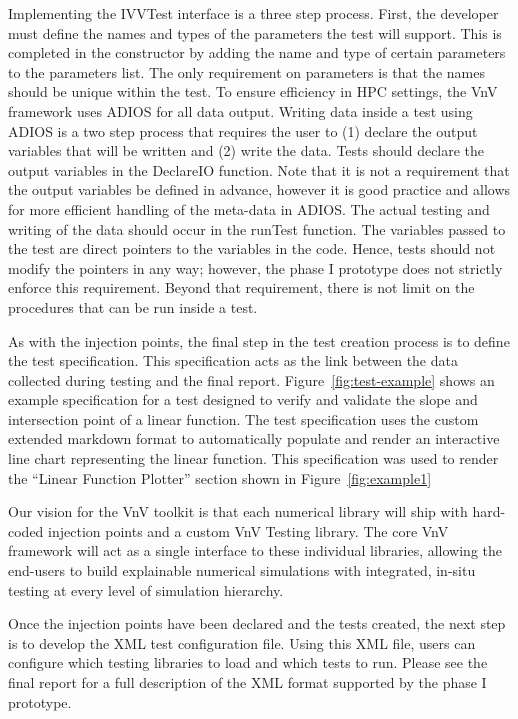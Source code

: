 Implementing the IVVTest interface is a three step process. First, the developer must define the names and types of the parameters the test will support. This is completed in the constructor by adding the name and type of certain parameters to the parameters list. The only requirement on parameters is that the names should be unique within the test. To ensure efficiency in HPC settings, the VnV framework uses ADIOS for all data output. Writing data inside a test using ADIOS is a two step process that requires the user to (1) declare the output variables that will be written and (2) write the data. Tests should declare the output variables in the DeclareIO function. Note that it is not a requirement that the output variables be defined in advance, however it is good practice and allows for more efficient handling of the meta-data in ADIOS. The actual testing and writing of the data should occur in the runTest function. The variables passed to the test are direct pointers to the variables in the code. Hence, tests should not modify the pointers in any way; however, the phase I prototype does not strictly enforce this requirement. Beyond that requirement, there is not limit on the procedures that can be run inside a test. 

As with the injection points, the final step in the test creation process is to define the test specification. This specification acts as the link between the data collected during testing and the final report. Figure~\ref{fig:test-example} shows an example specification for a test designed to verify and validate the slope and intersection point of a linear function. The test specification uses the custom extended markdown format to automatically populate and render an interactive line chart representing the linear function. This specification was used to render the ``Linear Function Plotter'' section shown in Figure~\ref{fig:example1}

Our vision for the VnV toolkit is that each numerical library will ship with hard-coded injection points and a custom VnV Testing library. The core VnV framework will act as a single interface to these individual libraries, allowing the end-users to build explainable numerical simulations with integrated, in-situ testing at every level of simulation hierarchy. 

Once the injection points have been declared and the tests created, the next step is to develop the XML test configuration file. Using this XML file, users can configure which testing libraries to load and which tests to run. Please see the final report for a full description of the XML format supported by the phase I prototype. 

